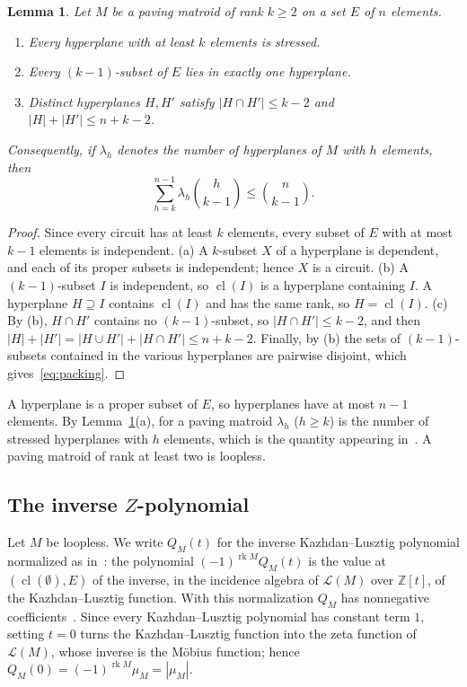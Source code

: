 \documentclass[11pt]{amsart}
\newtheorem{lemma}[theorem]{Lemma}
\theoremstyle{definition}
\theoremstyle{remark}
\numberwithin{equation}{section}
\DeclareMathOperator{\rk}{rk}
\DeclareMathOperator{\cl}{cl}
\newcommand{\cL}{\mathcal{L}}
\begin{document}
\begin{lemma}\label{lem:hyperplanes}
Let $M$ be a paving matroid of rank $k\ge2$ on a set $E$ of $n$ elements.
\begin{enumerate}
\item[(a)] Every hyperplane with at least $k$ elements is stressed.
\item[(b)] Every $(k-1)$-subset of $E$ lies in exactly one hyperplane.
\item[(c)] Distinct hyperplanes $H,H'$ satisfy $|H\cap H'|\le k-2$ and $|H|+|H'|\le n+k-2$.
\end{enumerate}
Consequently, if $\lambda_h$ denotes the number of hyperplanes of $M$ with $h$ elements, then
\begin{equation}\label{eq:packing}
\sum_{h=k}^{n-1}\lambda_h\binom{h}{k-1}\le\binom{n}{k-1}.
\end{equation}
\end{lemma}

\begin{proof}
Since every circuit has at least $k$ elements, every subset of $E$ with at most $k-1$ elements is independent. (a) A $k$-subset $X$ of a hyperplane is dependent, and each of its proper subsets is independent; hence $X$ is a circuit. (b) A $(k-1)$-subset $I$ is independent, so $\cl(I)$ is a hyperplane containing $I$. A hyperplane $H\supseteq I$ contains $\cl(I)$ and has the same rank, so $H=\cl(I)$. (c) By (b), $H\cap H'$ contains no $(k-1)$-subset, so $|H\cap H'|\le k-2$, and then $|H|+|H'|=|H\cup H'|+|H\cap H'|\le n+k-2$. Finally, by (b) the sets of $(k-1)$-subsets contained in the various hyperplanes are pairwise disjoint, which gives~\eqref{eq:packing}.
\end{proof}

A hyperplane is a proper subset of $E$, so hyperplanes have at most $n-1$ elements. By Lemma~\ref{lem:hyperplanes}(a), for a paving matroid $\lambda_h$ ($h\ge k$) is the number of stressed hyperplanes with $h$ elements, which is the quantity appearing in~\cite{GLX,GRX}. A paving matroid of rank at least two is loopless.

\subsection{The inverse \texorpdfstring{$Z$}{Z}-polynomial}
Let $M$ be loopless. We write $Q_M(t)$ for the inverse Kazhdan--Lusztig polynomial normalized as in~\cite[Section~2.2]{GX}: the polynomial $(-1)^{\rk M}Q_M(t)$ is the value at $(\cl(\emptyset),E)$ of the inverse, in the incidence algebra of $\cL(M)$ over $\mathbb{Z}[t]$, of the Kazhdan--Lusztig function. With this normalization $Q_M$ has nonnegative coefficients~\cite{BHMPW}. Since every Kazhdan--Lusztig polynomial has constant term $1$, setting $t=0$ turns the Kazhdan--Lusztig function into the zeta function of $\cL(M)$, whose inverse is the Möbius function; hence $Q_M(0)=(-1)^{\rk M}\mu_M=|\mu_M|$.
\end{document}

